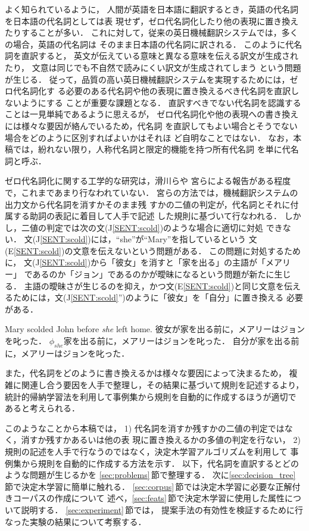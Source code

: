 よく知られているように，
人間が英語を日本語に翻訳するとき，英語の代名詞を日本語の代名詞としては表
現せず，ゼロ代名詞化したり他の表現に置き換えたりすることが多い．
これに対して，従来の英日機械翻訳システムでは，多くの場合，英語の代名詞は
そのまま日本語の代名詞に訳される．
このように代名詞を直訳すると，
英文が伝えている意味と異なる意味を伝える訳文が生成されたり，
文意は同じでも不自然で読みにくい訳文が生成されてしまう
という問題が生じる．
従って，品質の高い英日機械翻訳システムを実現するためには，ゼロ代名詞化す
る必要のある代名詞や他の表現に置き換えるべき代名詞を直訳しないようにする
ことが重要な課題となる．
直訳すべきでない代名詞を認識することは一見単純であるように思えるが，
ゼロ代名詞化や他の表現への書き換えには様々な要因が絡んでいるため，代名詞
を直訳してもよい場合とそうでない場合をどのように区別すればよいかはそれほ
ど自明なことではない．
なお，本稿では，紛れない限り，人称代名詞と限定的機能を持つ所有代名詞
\cite{Quirk85}を単に代名詞と呼ぶ．

ゼロ代名詞化に関する工学的な研究は，滑川ら\cite{Namekawa99}や
宮ら\cite{Miya00}による報告がある程度で，これまであまり行なわれていない． 
宮らの方法では，機械翻訳システムの出力文から代名詞を消すかそのまま残
すかの二値の判定が，代名詞とそれに付属する助詞の表記に着目して人手で記述
した規則に基づいて行なわれる．
しかし，二値の判定では次の文(J\ref{SENT:scold})のような場合に適切に対処
できない．
文(J\ref{SENT:scold})には，``she''が``Mary''を指しているという
文(E\ref{SENT:scold})の文意を伝えないという問題がある\cite{Kanzaki94}．
この問題に対処するために，
文(J\ref{SENT:scold})から「彼女」を消すと「家を出る」の主語が「メアリー」
であるのか「ジョン」であるのかが曖昧になるという問題が新たに生じる．
主語の曖昧さが生じるのを抑え，かつ文(E\ref{SENT:scold})と同じ文意を伝え
るためには，文(J\ref{SENT:scold}'')のように「彼女」を「自分」に置き換える
必要がある．
\begin{SENT3}
\sentE Mary scolded John before {\it she} left home. 
\sentJ 彼女が家を出る前に，メアリーはジョンを叱った．
\NewsentJ $\phi_{she}$家を出る前に，メアリーはジョンを叱った．
\YAJ 自分が家を出る前に，メアリーはジョンを叱った．
\label{SENT:scold}
\end{SENT3}
また，代名詞をどのように書き換えるかは様々な要因によって決まるため，
複雑に関連し合う要因を人手で整理し，その結果に基づいて規則を記述するより，
統計的帰納学習法を利用して事例集から規則を自動的に作成するほうが適切で
あると考えられる．

このようなことから本稿では，
1) 代名詞を消すか残すかの二値の判定ではなく，消すか残すかあるいは他の表
現に置き換えるかの多値の判定を行ない，
2) 規則の記述を人手で行なうのではなく，決定木学習アルゴリズムを利用して
事例集から規則を自動的に作成する方法を示す．
以下，代名詞を直訳するとどのような問題が生じるかを
\ref{sec:problems}\,節で整理する．
次に\ref{sec:decision_tree}\,節で決定木学習に簡単に触れる．
\ref{sec:corpus}\,節では決定木学習に必要な正解付きコーパスの作成について
述べ，\ref{sec:feats}\,節で決定木学習に使用した属性について説明する．
\ref{sec:experiment}\,節では，
提案手法の有効性を検証するために行なった実験の結果について考察する．

